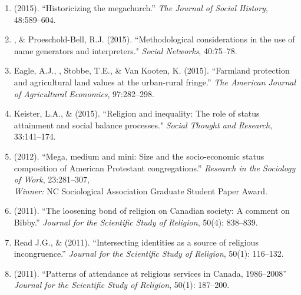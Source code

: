 \begin{enumerate}
\item \Eagle \hspace{.01em} (2015). ``Historicizing the megachurch.'' \textit{The Journal of Social History}, 48:589--604. 

\item \Eagle, \& Proeschold-Bell, R.J. (2015). ``Methodological considerations in the use of name generators and interpreters." \emph{Social Networks}, 40:75--78. 

\item Eagle, A.J., \Eagle, Stobbe, T.E., \& Van Kooten, K. (2015). ``Farmland protection and agricultural land values at the urban-rural fringe.'' \emph{The American Journal of Agricultural Economics}, 97:282--298. 

\item Keister, L.A., \& \Eagle \hspace{.01em} (2015). ``Religion and inequality: The role of status attainment and social balance processes." \emph{Social Thought and Research}, 33:141--174.

\item \Eagle \hspace{.01em} (2012). ``Mega, medium and mini: Size and the socio-economic status composition of American Protestant congregations.'' \emph{Research in the Sociology of Work}, 23:281--307, \\ \emph{Winner:} NC Sociological Association Graduate Student Paper Award.

\item \Eagle \hspace{.01em} (2011). ``The loosening bond of religion on Canadian society: A comment on Bibby.'' \emph{Journal for the Scientific Study of Religion}, 50(4): 838--839.

\item Read J.G., \& \Eagle \hspace{.01em} (2011). ``Intersecting identities as a source of religious incongruence.''  \emph{Journal for the Scientific Study of Religion}, 50(1): 116--132. 

\item \Eagle \hspace{.01em} (2011). ``Patterns of attendance at religious services in Canada, 1986--2008'' \emph{Journal for the Scientific Study of Religion}, 50(1): 187--200. 


\end{enumerate}
